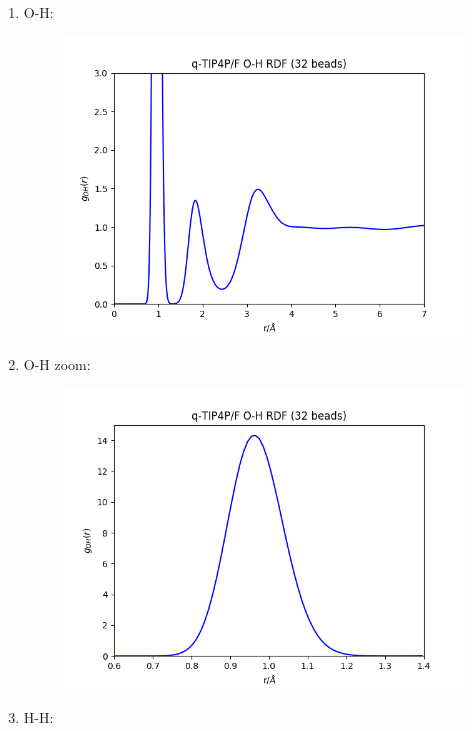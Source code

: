 \documentclass[12pt,reqno]{amsart}
\numberwithin{equation}{section}
\begin{document}
\begin{enumerate}
\item O-H:

\begin{figure}[H]
\centering
\includegraphics[scale=0.6]{0_1-32bead-bonded-tip4pF-bin01}
\end{figure}

\item O-H zoom:

\begin{figure}[H]
\centering
\includegraphics[scale=0.6]{0_1-32bead-bonded-tip4pF-bin01-zoom}
\end{figure}

\item H-H:


\end{enumerate}
\end{document}
